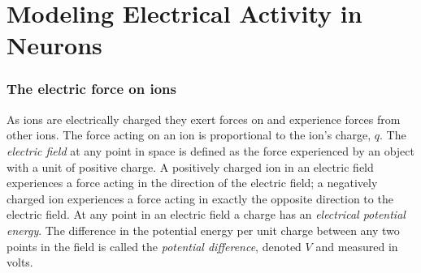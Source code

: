 

\section{Modeling Electrical Activity in Neurons}

\subsubsection{The electric force on ions}

As ions are electrically charged they exert forces on and experience forces from other ions. The force acting on an ion is proportional to the ion’s charge, $q$. The \textit{electric field} at any point in space is defined as the force experienced by an object with a unit of positive charge. A positively charged ion in an electric field experiences a force acting in the direction of the electric field; a negatively charged ion experiences a force acting in exactly the opposite direction to the electric field. At any point in an electric field a charge has an \textit{electrical potential energy}. The difference in the potential energy per unit charge between any two points in the field is called the \textit{potential difference}, denoted $V$ and measured in volts.

